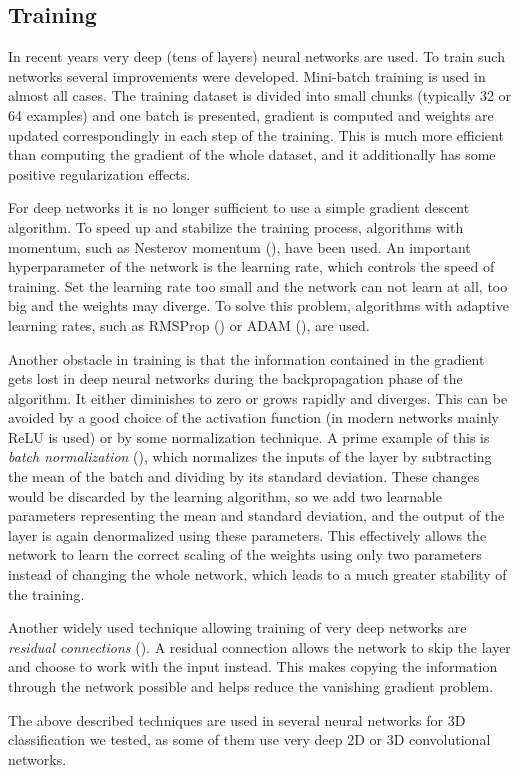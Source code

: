 \subsection{Training}
\label{sec:training}
In recent years very deep (tens of layers) neural networks are used. To train such networks several improvements were developed. Mini-batch training is used in almost all cases. The training dataset is divided into small chunks (typically 32 or 64 examples) and one batch is presented, gradient is computed and weights are updated correspondingly in each step of the training. This is much more efficient than computing the gradient of the whole dataset, and it additionally has some positive regularization effects. \par
For deep networks it is no longer sufficient to use a simple gradient descent algorithm. To speed up and stabilize the training process, algorithms with momentum, such as Nesterov momentum (\cite{sutskever_importance_2013}), have been used. An important hyperparameter of the network is the learning rate, which controls the speed of training. Set the learning rate too small and the network can not learn at all, too big and the weights may diverge. To solve this problem, algorithms with adaptive learning rates, such as 
RMSProp (\cite{hinton_neural_2012}) or ADAM (\cite{kingma_adam:_2014}), are used. \par
Another obstacle in training is that the information contained in the gradient gets lost in deep neural networks during the backpropagation phase of the algorithm. It either diminishes to zero or grows rapidly and diverges. This can be avoided by a good choice of the activation function (in modern networks mainly ReLU is used) or by some normalization technique. A prime example of this is \textit{batch normalization} (\cite{ioffe_batch_2015}), which normalizes the inputs of the layer by subtracting the mean of the batch and dividing by its standard deviation. These changes would be discarded by the learning algorithm, so we add two learnable parameters representing the mean and standard deviation, and the output of the layer is again denormalized using these parameters. This effectively allows the network to learn the correct scaling of the weights using only two parameters instead of changing the whole network, which leads to a much greater stability of the training.\par
Another widely used technique allowing training of very deep networks are \textit{residual connections} (\cite{szegedy_inception-v4_2016}). A residual connection allows the network to skip the layer and choose to work with the input instead. This makes copying the information through the network possible and helps reduce the vanishing gradient problem. \par
The above described techniques are used in several neural networks for 3D classification we tested, as some of them use very deep 2D or 3D convolutional networks.

